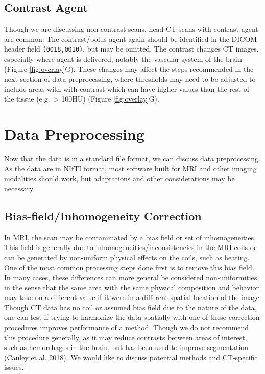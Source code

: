 \documentclass[]{elsarticle} %
\begin{document}
\hypertarget{contrast-agent}{%
\subsection{Contrast Agent}\label{contrast-agent}}

Though we are discussing non-contrast scans, head CT scans with contrast agent are common. The contrast/bolus agent again should be identified in the DICOM header field \texttt{(0018,0010)}, but may be omitted. The contrast changes CT images, especially where agent is delivered, notably the vascular system of the brain (Figure \ref{fig:overlay}G). These changes may affect the steps recommended in the next section of data preprocessing, where thresholds may need to be adjusted to include areas with with contrast which can have higher values than the rest of the tissue (e.g.~\textgreater{} 100HU) (Figure \ref{fig:overlay}G).

\hypertarget{data-preprocessing}{%
\section{Data Preprocessing}\label{data-preprocessing}}

Now that the data is in a standard file format, we can discuss data preprocessing. As the data are in NIfTI format, most software built for MRI and other imaging modalities should work, but adaptations and other considerations may be necessary.

\hypertarget{bias-fieldinhomogeneity-correction}{%
\subsection{Bias-field/Inhomogeneity Correction}\label{bias-fieldinhomogeneity-correction}}

In MRI, the scan may be contaminated by a bias field or set of inhomogeneities. This field is generally due to inhomogeneities/inconsistencies in the MRI coils or can be generated by non-uniform physical effects on the coils, such as heating. One of the most common processing steps done first is to remove this bias field. In many cases, these differences can more general be considered non-uniformities, in the sense that the same area with the same physical composition and behavior may take on a different value if it were in a different spatial location of the image. Though CT data has no coil or assumed bias field due to the nature of the data, one can test if trying to harmonize the data spatially with one of these correction procedures improves performance of a method. Though we do not recommend this procedure generally, as it may reduce contrasts between areas of interest, such as hemorrhages in the brain, but has been used to improve segmentation (Cauley et al. 2018). We would like to discuss potential methods and CT-specific issues.
\end{document}
